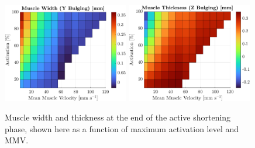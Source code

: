 \documentclass{sfuthesis}
\numberwithin{equation}{section}
\numberwithin{figure}{chapter}
\numberwithin{table}{chapter}
\theoremstyle{definition}
\begin{document}
\begin{figure}
    \centering
    \includegraphics[width=0.49\textwidth]{10_vmuscle_activation_Y-bulging.eps}
    \includegraphics[width=0.49\textwidth]{11_vmuscle_activation_Z-bulging.eps}
    \caption{Muscle width and thickness at the end of the active shortening phase, shown here as a function of maximum activation level and MMV.
    \label{fig:g_bulging}}
\end{figure}


\end{document}
